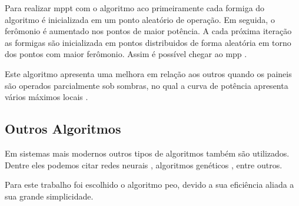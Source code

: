 Para realizar \gls{mppt} com o algoritmo \gls{aco} primeiramente cada formiga do algoritmo é inicializada em um ponto aleatório de operação. Em seguida, o ferômonio é aumentado nos pontos de maior potência. A cada próxima iteração as formigas são inicializada em pontos distribuidos de forma aleatória em torno dos pontos com maior ferômonio. Assim é possível chegar ao \gls{mpp} \cite{jiang2013}.

Este algoritmo apresenta uma melhora em relação aos outros quando os paineis são operados parcialmente sob sombras, no qual a curva de potência apresenta vários máximos locais \cite{jiang2013}.

\subsection{Outros Algoritmos}

Em sistemas mais modernos outros tipos de algoritmos também são utilizados. Dentre eles podemos citar redes neurais \cite{elobaid2012}, algoritmos genéticos \cite{daraban2013}, entre outros.

Para este trabalho foi escolhido o algoritmo \gls{peo}, devido a sua eficiência aliada a sua grande simplicidade.
